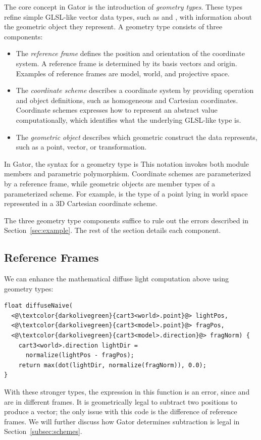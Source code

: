 The core concept in Gator is the introduction of \emph{geometry types}.
These types refine simple GLSL-like vector data types, such as  and , with information about the geometric object they represent.
A geometry type consists of three components:
%
\begin{itemize}
\item The \emph{reference frame} defines the position and orientation of the coordinate system. A reference frame is determined by its basis vectors and origin. Examples of reference frames are model, world, and projective space. 
\item The \emph{coordinate scheme} describes a coordinate system by providing operation and object definitions, such as homogeneous and Cartesian coordinates. Coordinate schemes expresses how to represent an abstract value computationally, which identifies what the underlying GLSL-like type is.
\item The \emph{geometric object} describes which geometric construct the data represents, such as a point, vector, or transformation.
\end{itemize}
%
In Gator, the syntax for a geometry type is 
%
%
This notation invokes both module members and parametric polymorphism.
Coordinate schemes are parameterized by a reference frame, while geometric objects are member types of a parameterized scheme.
For example,  is the type of a point lying in world space represented in a 3D Cartesian coordinate scheme.

The three geometry type components suffice to rule out the errors described in Section~\ref{sec:example}.
The rest of the section details each component. 

\subsection{Reference Frames}
\label{subsec:geotypes}
We can enhance the mathematical diffuse light computation above using geometry types:
%
\begin{lstlisting}
float diffuseNaive(
  <@\textcolor{darkolivegreen}{cart3<world>.point}@> lightPos, 
  <@\textcolor{darkolivegreen}{cart3<model>.point}@> fragPos, 
  <@\textcolor{darkolivegreen}{cart3<model>.direction}@> fragNorm) {
    cart3<world>.direction lightDir = 
      normalize(lightPos - fragPos);
    return max(dot(lightDir, normalize(fragNorm)), 0.0);
}
\end{lstlisting}
%
With these stronger types, the expression  in this function is an error, since  and  are in different frames. 
It is geometrically legal to subtract two positions to produce a vector; the only issue with this code is the difference of reference frames.  
We will further discuss how Gator determines subtraction is legal in Section~\ref{subsec:schemes}.

